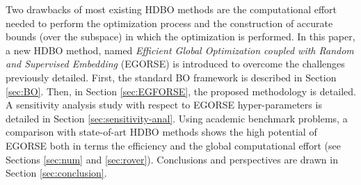 Two drawbacks of most existing HDBO methods are the computational effort needed to perform the optimization process and the construction of accurate bounds (over the subspace) in which the optimization is performed. 
In this paper, a new HDBO method, named \textit{Efficient Global Optimization coupled with Random and Supervised Embedding} (EGORSE) is introduced to overcome the challenges previously detailed.
First, the standard BO framework is described in Section \ref{sec:BO}.
Then, in Section \ref{sec:EGFORSE}, the proposed methodology is detailed. A sensitivity analysis study with respect to EGORSE hyper-parameters is detailed in Section \ref{sec:sensitivity-anal}. Using academic benchmark problems, a comparison with state-of-art HDBO methods shows the high potential of EGORSE both in terms the efficiency and the global computational effort (see Sections \ref{sec:num} and \ref{sec:rover}). Conclusions and perspectives are drawn in Section \ref{sec:conclusion}.